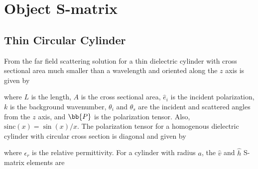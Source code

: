 

\section{Object S-matrix}

\subsection{Thin Circular Cylinder}

From \cite{sarabandi1990low, stiles1996scattering} the far field scattering solution for a thin dielectric cylinder with cross sectional area much smaller than a wavelength and oriented along the $z$ axis is given by 

\noindent where $L$ is the length, $A$ is the cross sectional area, $\hat{e}_i$ is the incident polarization, $k$ is the background wavenumber, $\theta_i$ and $\theta_s$ are the incident and scattered angles from the $z$ axis, and $\bb{P}$ is the polarization tensor. Also, $\textrm{sinc}(x) = \sin(x)/x$. The polarization tensor for a homogenous dielectric cylinder with circular cross section is diagonal and given by 

\noindent where $\epsilon_r$ is the relative permittivity. For a cylinder with radius $a$, the $\hat{v}$ and $\hat{h}$ S-matrix elements are 


